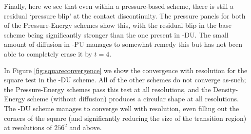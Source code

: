 Finally, here we see that even within a pressure-based scheme, there is still
a residual `pressure blip' at the contact discontinuity. The pressure panels
for both of the Pressure-Energy schemes show this, with the residual blip in
the base scheme being significantly stronger than the one present in 
\anarchy{}-DU. The small amount of diffusion in \anarchy{}-PU manages to
somewhat remedy this but has not been able to completely erase it by $t=4$.

In Figure \ref{fig:squareconvergence} we show the convergence with resolution
for the square test in the \anarchy{}-DU scheme. All of the other schemes
do not converge as-such; the Pressure-Energy schemes pass this test at all
resolutions, and the Density-Energy scheme (without diffusion) produces a
circular shape at all resolutions. The \anarchy{}-DU scheme manages to converge
well with resolution, even filling out the corners of the square (and significantly
reducing the size of the transition region) at resolutions of $256^2$ and above.